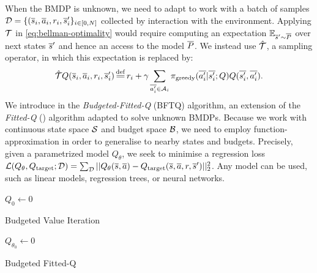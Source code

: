 \documentclass{article}
\begin{document}
When the BMDP is unknown, we need to adapt  to work with a batch of samples $\mathcal{D}=\{(\overline{s}_i,\overline{a}_i,r_i,\overline{s}_i'\}_{i\in [0,N]}$ collected by interaction with the environment. Applying $\mathcal{T}$ in \eqref{eq:bellman-optimality} would require computing an expectation $\operatorname*{\mathbb{E}}_{\overline{s}'\sim \overline{P}}$ over next states $\overline{s}'$ and hence an access to the model $\overline{P}$. We instead use $\hat{\mathcal{T}}$, a sampling operator, in which this expectation is replaced by:
\begin{equation*}
    \hat{\cT} Q(\os_i, \oa_i, r_i, \os'_i) \eqdef r_i + \gamma \sum_{\ov{a'_i}\in \cA_i} \pi_\text{greedy}(\ov{a'_i}|\ov{s'_i}; Q) Q(\ov{s'_i}, \ov{a'_i}).
\end{equation*}
We introduce in  the \emph{Budgeted-Fitted-Q} (BFTQ) algorithm, an extension of the \emph{Fitted-Q} (\FTQ) algorithm \citep{Ernst2005,Riedmiller2005} adapted to solve unknown BMDPs. Because we work with  continuous state space $\mathcal{S}$ and budget space $\mathcal{B}$, we need to employ function-approximation in order to generalise to nearby states and budgets. Precisely, given a parametrized model $Q_\theta$, we seek to minimise a regression loss $\mathcal{L}(Q_\theta, Q_\text{target};\mathcal{D}) = \sum_{\mathcal{D}} ||Q_\theta(\overline{s}, \overline{a}) - Q_\text{target}(\overline{s}, \overline{a}, r, \overline{s}')||_2^2$.
Any model can be used, such as linear models, regression trees, or neural networks.

\begin{minipage}[t]{0.47\textwidth}
\vspace{0pt}  

\begin{algorithm}[H]
\DontPrintSemicolon
{}
$Q_{0} \leftarrow 0$\;
\caption{Budgeted Value Iteration}
\label{algo:bvi}

\end{algorithm}

\end{minipage}%
\hfill
\begin{minipage}[t]{0.47\textwidth}
\vspace{0pt}

\begin{algorithm}[H]
\DontPrintSemicolon
\KwData{$\cD$}
$Q_{\theta_0} \leftarrow 0$\;
\caption{Budgeted Fitted-Q}
\label{algo:bftq}

\end{algorithm}

\end{minipage}
\end{document}
